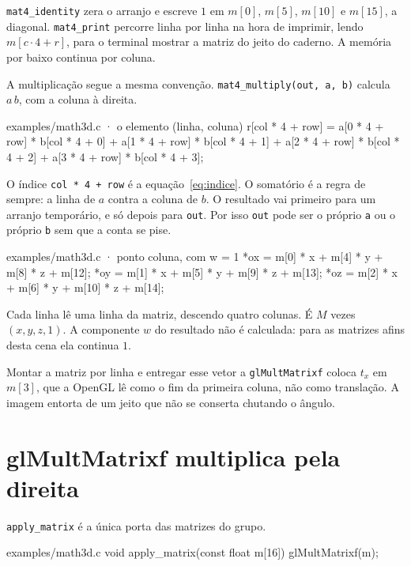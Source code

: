 \documentclass[11pt,a4paper]{article}
\newcommand{\fn}[1]{\texttt{\nobreak\hspace{0pt}#1}}
\begin{document}
\fn{mat4\_identity} zera o arranjo e escreve \(1\) em \(m[0]\), \(m[5]\), \(m[10]\) e \(m[15]\), a diagonal. \fn{mat4\_print} percorre linha por linha na hora de imprimir, lendo \(m[c\cdot 4+r]\), para o terminal mostrar a matriz do jeito do caderno. A memória por baixo continua por coluna.

A multiplicação segue a mesma convenção. \fn{mat4\_multiply(out, a, b)} calcula \(a\,b\), com a coluna à direita.

\begin{codigo}{examples/math3d.c · o elemento (linha, coluna)}
r[col * 4 + row] =
    a[0 * 4 + row] * b[col * 4 + 0] +
    a[1 * 4 + row] * b[col * 4 + 1] +
    a[2 * 4 + row] * b[col * 4 + 2] +
    a[3 * 4 + row] * b[col * 4 + 3];
\end{codigo}

O índice \fn{col * 4 + row} é a equação~\eqref{eq:indice}. O somatório é a regra de sempre: a linha de \(a\) contra a coluna de \(b\). O resultado vai primeiro para um arranjo temporário, e só depois para \fn{out}. Por isso \fn{out} pode ser o próprio \fn{a} ou o próprio \fn{b} sem que a conta se pise.

\begin{codigo}{examples/math3d.c · ponto coluna, com w = 1}
*ox = m[0] * x + m[4] * y + m[8] * z + m[12];
*oy = m[1] * x + m[5] * y + m[9] * z + m[13];
*oz = m[2] * x + m[6] * y + m[10] * z + m[14];
\end{codigo}

Cada linha lê uma linha da matriz, descendo quatro colunas. É \(M\) vezes \((x, y, z, 1)\). A componente \(w\) do resultado não é calculada: para as matrizes afins desta cena ela continua \(1\).

\begin{cuidado}
Montar a matriz por linha e entregar esse vetor a \fn{glMultMatrixf} coloca \(t_x\) em \(m[3]\), que a OpenGL lê como o fim da primeira coluna, não como translação. A imagem entorta de um jeito que não se conserta chutando o ângulo.
\end{cuidado}

\section{glMultMatrixf multiplica pela direita}
\label{sec:ordem}

\fn{apply\_matrix} é a única porta das matrizes do grupo.

\begin{codigo}{examples/math3d.c}
void apply_matrix(const float m[16])
{
    glMultMatrixf(m);
}
\end{codigo}
\end{document}
